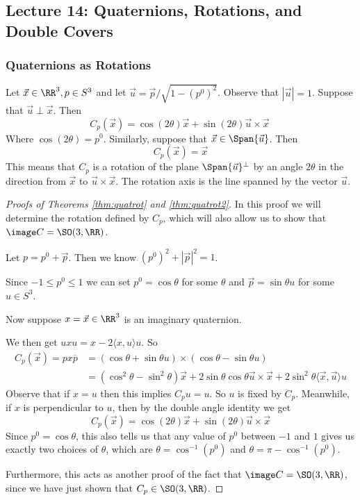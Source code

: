 \subsection{Lecture 14: Quaternions, Rotations, and Double Covers}

\subsubsection{Quaternions as Rotations}
\begin{thm}
    Let $\vec{x}\in\RR^3, p\in S^3$ and let $\vec{u} = \vec{p}/\sqrt{1-(p^0)^2}$. Observe that $|\vec{u}|=1$.
 Suppose that $\vec{u} \perp\vec{x}$.  Then
    \begin{equation}
        C_p(\vec{x}) = \cos(2\theta)\vec{x} + \sin(2\theta)\vec{u}\times\vec{x}\
    \end{equation}
    Where $\cos(2\theta) = p^0$.
    Similarly, suppose that $\vec{x}  \in\Span\{\vec{u}\}$. Then 
    \begin{equation}
        C_p(\vec{x}) = \vec{x}
    \end{equation}
     This means that $C_p$ is a rotation of the plane $\Span\{\vec{u}\}^\perp$ by an angle $2\theta$ in the direction from $\vec{x}$ to $\vec{u}\times\vec{x}$. The rotation axis is the line spanned by the vector $\vec{u}$.\label{thm:quatrot2}
\end{thm}

\begin{proof}[Proofs of Theorems \ref{thm:quatrot} and \ref{thm:quatrot2}]
In this proof we will determine the rotation defined by $C_p$, which will also allow us to show that $\image C = \SO(3,\RR)$.

Let $p = p^0+\vec{p}$. Then we know $(p^0)^2 + |\vec{p}|^2 = 1$. 

Since $-1\leq p^0\leq 1$ we can set $p^0 = \cos\theta$ for some $\theta$ and $\vec{p} = \sin\theta u$ for some $u\in S^3$.

Now suppose $x=\vec{x} \in \RR^3$ is an imaginary quaternion.

We then get $uxu = x-2\langle x,u\rangle u$. So 
\begin{align*}
    C_p(\vec{x}) =px\overline{p}&= (\cos\theta + \sin\theta u)\times (\cos\theta-\sin\theta u)\\
    &= (\cos^2\theta - \sin^2\theta)\vec{x} + 2\sin\theta\cos\theta \vec{u} \times \vec{x} + 2\sin^2\theta \langle \vec{x},\vec{u}\rangle u
\end{align*}
Observe that if $x=u$ then this implies $C_p u = u$. So $u$ is fixed by $C_p$. Meanwhile, if $x$ is perpendicular to $u$, then by the double angle identity we get
\[C_p(\vec{x}) = \cos(2\theta)\vec{x} + \sin(2\theta)\vec{u}\times\vec{x}\]
Since $p^0 = \cos\theta$, this also tells us that any value of $p^0$ between $-1$ and $1$ gives us exactly two choices of $\theta$, which are $\theta = \cos^{-1}(p^0)$ and $\theta =\pi -\cos^{-1}(p^0)$.

Furthermore, this acts as another proof of the fact that $\image C = \SO(3,\RR)$, since we have just shown that $C_p \in \SO(3,\RR)$.
\end{proof}

